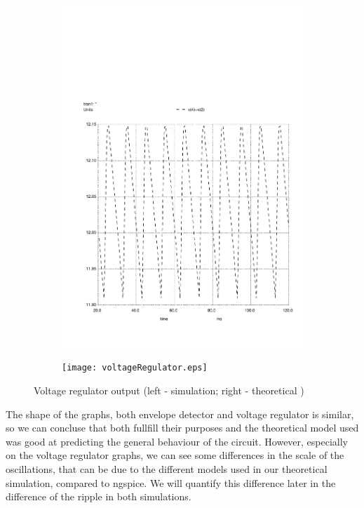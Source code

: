 \begin{figure}[h]
    \centering
    \begin{subfigure}{0.23\textwidth}
        \includegraphics[width=\linewidth, clip]{solution1.pdf}
        \label{fig:voltr1}
    \end{subfigure}
    \begin{subfigure}{0.23\textwidth}
        \texttt{[image: voltageRegulator.eps]}
        \label{fig:voltr2}
    \end{subfigure}
    \caption{\small Voltage regulator output (left - simulation; right - theoretical )}
    \label{volt_reg}
\end{figure}

The shape of the graphs, both envelope detector and voltage regulator is similar, so we can concluse that both fullfill their purposes and the theoretical model used was good at predicting the general behaviour of the circuit. 
However, especially on the voltage regulator graphs, we can see some differences in the scale of the oscillations, that can be due to the different models used in our theoretical simulation, compared to ngspice.
We will quantify this difference later in the difference of the ripple in both simulations.

